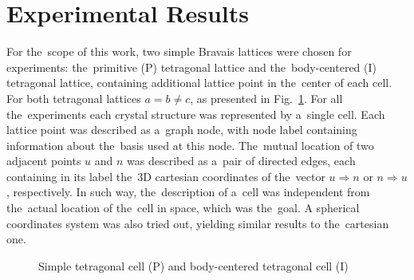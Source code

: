 \documentclass{llncs}
\begin{document}
\section{Experimental Results}
For the~scope of this work, two simple Bravais lattices were chosen for experiments: the~primitive (P) tetragonal lattice and the~body-centered (I) tetragonal lattice, containing additional lattice point in the~center of each cell. For both tetragonal lattices $a = b \neq c$, as presented in Fig.~\ref{fig:bravais}. For all the~experiments each crystal structure was represented by a~single cell. Each lattice point was described as a~graph node, with node label containing information about the~basis used at this node. The~mutual location of two adjacent points $u$ and $n$ was described as a~pair of directed edges, each containing in its label the~3D cartesian coordinates of the~vector $u \Rightarrow n$ or $n \Rightarrow u$, respectively. In such way, the~description of a~cell was independent from the~actual location of the~cell in space, which was the~goal. A spherical coordinates system was also tried out, yielding similar results to the~cartesian one.


\begin{figure}[h!]
\begin{center}
	\caption[]{Simple tetragonal cell (P) and body-centered tetragonal cell (I)}
	\label{fig:bravais}
\end{center}
\end{figure}
\end{document}
